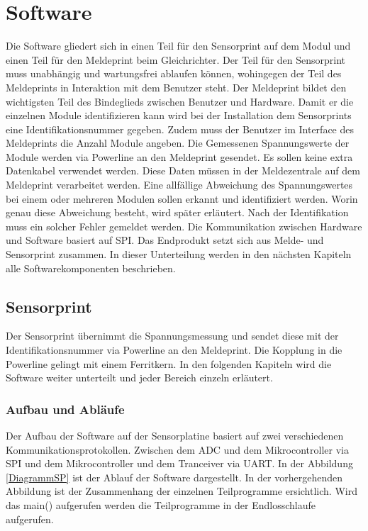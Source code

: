 \section{Software}
Die Software gliedert sich in einen Teil für den Sensorprint auf dem Modul und einen Teil für den Meldeprint beim Gleichrichter. Der Teil für den Sensorprint muss unabhängig und wartungsfrei ablaufen können, wohingegen der Teil des Meldeprints in Interaktion mit dem Benutzer steht. Der Meldeprint bildet den wichtigsten Teil des Bindeglieds zwischen Benutzer und Hardware. Damit er die einzelnen Module identifizieren kann wird bei der Installation dem Sensorprints eine Identifikationsnummer gegeben. Zudem muss der Benutzer im Interface des Meldeprints die Anzahl Module angeben. Die Gemessenen Spannungswerte der Module werden via Powerline an den Meldeprint gesendet. Es sollen keine extra Datenkabel verwendet werden. Diese Daten müssen in der Meldezentrale auf dem Meldeprint verarbeitet werden. Eine allfällige Abweichung des Spannungswertes bei einem oder mehreren Modulen sollen erkannt und identifiziert werden. Worin genau diese Abweichung besteht, wird später erläutert. Nach der Identifikation muss ein solcher Fehler gemeldet werden. Die Kommunikation zwischen Hardware und Software basiert auf SPI. Das Endprodukt setzt sich aus Melde- und Sensorprint zusammen. In dieser Unterteilung werden in den nächsten Kapiteln alle Softwarekomponenten beschrieben.






\subsection{Sensorprint}
Der Sensorprint übernimmt die Spannungsmessung und sendet diese mit der Identifikationsnummer via Powerline an den Meldeprint. Die Kopplung in die Powerline gelingt mit einem Ferritkern. In den folgenden Kapiteln wird die Software weiter unterteilt und jeder Bereich einzeln erläutert.
\subsubsection{Aufbau und Abläufe}
Der Aufbau der Software auf der Sensorplatine basiert auf zwei verschiedenen Kommunikationsprotokollen. Zwischen dem ADC und dem Mikrocontroller via SPI und dem Mikrocontroller und dem Tranceiver via UART. In der Abbildung \ref{DiagrammSP} ist der Ablauf der Software dargestellt.
In der vorhergehenden Abbildung ist der Zusammenhang der einzelnen Teilprogramme ersichtlich. Wird das main() aufgerufen werden die Teilprogramme in der Endlosschlaufe aufgerufen.
